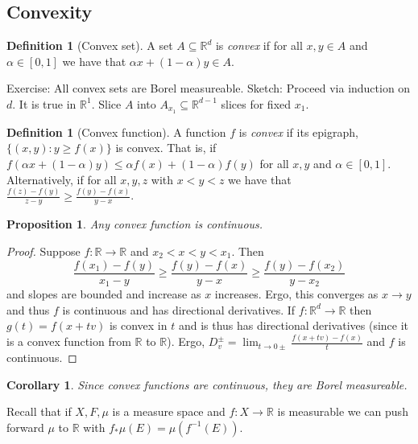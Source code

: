 \documentclass{article}
\newtheorem{proposition}[theorem]{Proposition}
\newtheorem{corollary}[theorem]{Corollary}
\theoremstyle{definition}
\newtheorem{definition}[theorem]{Definition}
\begin{document}
\subsection{Convexity}

\begin{definition}[Convex set]
    A set \(A\subseteq \mathbb{R}^d\) is \textit{convex} if for all \(x,y\in A\) and \(\alpha\in[0,1]\) we have that
    \(\alpha x+(1-\alpha)y\in A\).
\end{definition}

Exercise: All convex sets are Borel measureable. Sketch: Proceed via induction on \(d\). It is true in \(\mathbb{R}^1\). Slice
\(A\) into \(A_{x_1}\subseteq\mathbb{R}^{d-1}\) slices for fixed \(x_1\).

\begin{definition}[Convex function]
    A function \(f\) is \textit{convex} if its epigraph, \( \{(x,y):y\geq f(x)\} \) is convex. That is, if
    \(f(\alpha x+(1-\alpha) y)\leq \alpha f(x)+(1-\alpha) f(y)\) for all \(x,y\) and \(\alpha\in[0,1]\). Alternatively,
    if for all \(x,y,z\) with \(x<y<z\) we have that \(\frac{f(z)-f(y)}{z-y}\geq \frac{f(y)-f(x)}{y-x}\).
\end{definition}

\begin{proposition}
    Any convex function is continuous.
\end{proposition}
\begin{proof}
    Suppose \(f:\mathbb{R}\rightarrow\mathbb{R} \) and \(x_2<x<y<x_1\). Then 
    \[
        \frac{f(x_1)-f(y)}{x_1-y}\geq\frac{f(y)-f(x)}{y-x}\geq \frac{f(y)-f(x_2)}{y-x_2}
    \]
    and slopes are bounded and increase as \(x\) increases. Ergo, this converges as \(x\to y\) and thus \(f\) is
    continuous and has directional derivatives. If \(f:\mathbb{R}^d\rightarrow\mathbb{R}\) then \(g(t)=f(x+tv)\) is convex in \(t\)
    and is thus has directional derivatives (since it is a convex function from \(\mathbb{R} \) to \(\mathbb{R} \)).
    Ergo, \(D_v^\pm = \lim_{t\to 0\pm} \frac{f(x+tv)-f(x)}{t}\) and \(f\) is continuous.
\end{proof}
\begin{corollary}
    Since convex functions are continuous, they are Borel measureable.
\end{corollary}

Recall that if \(X,F,\mu \) is a measure space and \(f:X\rightarrow \mathbb{R} \) is measurable we can push forward \(\mu \)
to \(\mathbb{R} \) with \(f_*\mu(E)=\mu(f^{-1}(E)) \).
\end{document}
